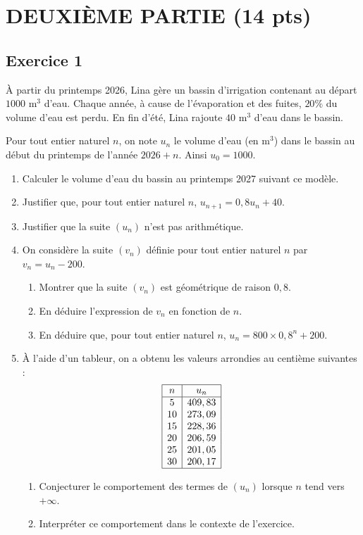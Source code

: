 \documentclass[a4paper,12pt]{article}
\begin{document}
\newpage

\section*{DEUXIÈME PARTIE (14 pts)}

\subsection*{Exercice 1}

À partir du printemps 2026, Lina gère un bassin d'irrigation contenant au départ $1000$ m$^3$ d'eau. Chaque année, à cause de l'évaporation et des fuites, $20\%$ du volume d'eau est perdu. En fin d'été, Lina rajoute $40$ m$^3$ d'eau dans le bassin.

Pour tout entier naturel $n$, on note $u_n$ le volume d'eau (en m$^3$) dans le bassin au début du printemps de l'année $2026+n$. Ainsi $u_0 = 1000$.

\begin{enumerate}
\item Calculer le volume d'eau du bassin au printemps 2027 suivant ce modèle.
\item Justifier que, pour tout entier naturel $n$, $u_{n+1} = 0,8 u_n + 40$.
\item Justifier que la suite $(u_n)$ n'est pas arithmétique.
\item On considère la suite $(v_n)$ définie pour tout entier naturel $n$ par $v_n = u_n - 200$.
\begin{enumerate}
\item Montrer que la suite $(v_n)$ est géométrique de raison $0,8$.
\item En déduire l'expression de $v_n$ en fonction de $n$.
\item En déduire que, pour tout entier naturel $n$, $u_n = 800 \times 0,8^n + 200$.
\end{enumerate}
\item À l'aide d'un tableur, on a obtenu les valeurs arrondies au centième suivantes :
\[
\begin{array}{|c|c|}
\hline
n & u_n \\
\hline
5 & 409,83 \\
10 & 273,09 \\
15 & 228,36 \\
20 & 206,59 \\
25 & 201,05 \\
30 & 200,17 \\
\hline
\end{array}
\]
\begin{enumerate}
\item Conjecturer le comportement des termes de $(u_n)$ lorsque $n$ tend vers $+\infty$.
\item Interpréter ce comportement dans le contexte de l'exercice.
\end{enumerate}
\end{enumerate}
\end{document}
